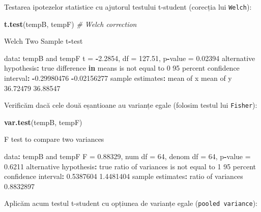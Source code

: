 \documentclass[]{article}
\newenvironment{Shaded}{\begin{snugshade}}{\end{snugshade}}
\newcommand{\KeywordTok}[1]{\textcolor[rgb]{0.13,0.29,0.53}{\textbf{#1}}}
\newcommand{\DecValTok}[1]{\textcolor[rgb]{0.00,0.00,0.81}{#1}}
\newcommand{\FloatTok}[1]{\textcolor[rgb]{0.00,0.00,0.81}{#1}}
\newcommand{\StringTok}[1]{\textcolor[rgb]{0.31,0.60,0.02}{#1}}
\newcommand{\CommentTok}[1]{\textcolor[rgb]{0.56,0.35,0.01}{\textit{#1}}}
\newcommand{\ControlFlowTok}[1]{\textcolor[rgb]{0.13,0.29,0.53}{\textbf{#1}}}
\newcommand{\OperatorTok}[1]{\textcolor[rgb]{0.81,0.36,0.00}{\textbf{#1}}}
\newcommand{\NormalTok}[1]{#1}
\begin{document}
Testarea ipotezelor statistice cu ajutorul testului t-student (corecția
lui \texttt{Welch}):

\begin{Shaded}
\begin{Highlighting}[]
\KeywordTok{t.test}\NormalTok{(tempB, tempF) }\CommentTok{# Welch correction }

\NormalTok{    Welch Two Sample t}\OperatorTok{-}\NormalTok{test}

\NormalTok{data}\OperatorTok{:}\StringTok{  }\NormalTok{tempB and tempF}
\NormalTok{t =}\StringTok{ }\OperatorTok{-}\FloatTok{2.2854}\NormalTok{, df =}\StringTok{ }\FloatTok{127.51}\NormalTok{, p}\OperatorTok{-}\NormalTok{value =}\StringTok{ }\FloatTok{0.02394}
\NormalTok{alternative hypothesis}\OperatorTok{:}\StringTok{ }\NormalTok{true difference }\ControlFlowTok{in}\NormalTok{ means is not equal to }\DecValTok{0}
\DecValTok{95}\NormalTok{ percent confidence interval}\OperatorTok{:}
\StringTok{ }\OperatorTok{-}\FloatTok{0.29980476} \OperatorTok{-}\FloatTok{0.02156277}
\NormalTok{sample estimates}\OperatorTok{:}
\NormalTok{mean of x mean of y }
 \FloatTok{36.72479}  \FloatTok{36.88547} 
\end{Highlighting}
\end{Shaded}

Verificăm dacă cele două eșantioane au varianțe egale (folosim testul
lui \texttt{Fisher}):

\begin{Shaded}
\begin{Highlighting}[]
\KeywordTok{var.test}\NormalTok{(tempB, tempF)}

\NormalTok{    F test to compare two variances}

\NormalTok{data}\OperatorTok{:}\StringTok{  }\NormalTok{tempB and tempF}
\NormalTok{F =}\StringTok{ }\FloatTok{0.88329}\NormalTok{, num df =}\StringTok{ }\DecValTok{64}\NormalTok{, denom df =}\StringTok{ }\DecValTok{64}\NormalTok{, p}\OperatorTok{-}\NormalTok{value =}\StringTok{ }\FloatTok{0.6211}
\NormalTok{alternative hypothesis}\OperatorTok{:}\StringTok{ }\NormalTok{true ratio of variances is not equal to }\DecValTok{1}
\DecValTok{95}\NormalTok{ percent confidence interval}\OperatorTok{:}
\StringTok{ }\FloatTok{0.5387604} \FloatTok{1.4481404}
\NormalTok{sample estimates}\OperatorTok{:}
\NormalTok{ratio of variances }
         \FloatTok{0.8832897} 
\end{Highlighting}
\end{Shaded}

Aplicăm acum testul t-student cu opțiunea de varianțe egale
(\texttt{pooled\ variance}):
\end{document}
